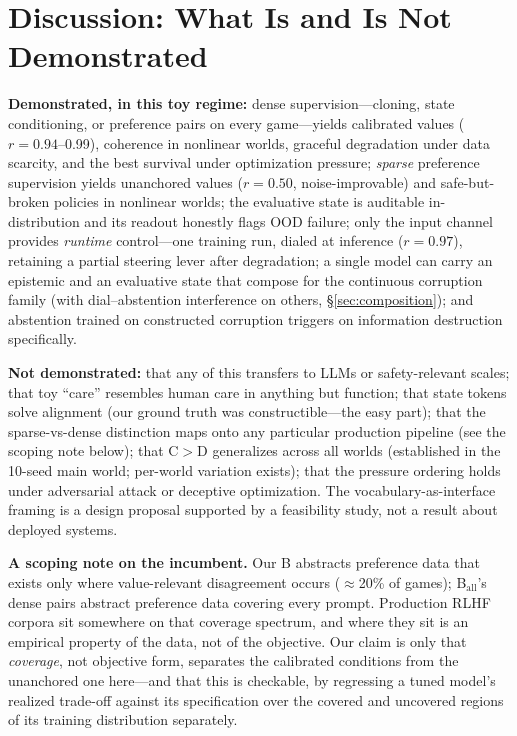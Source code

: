 \documentclass[11pt]{article}
\begin{document}
\section{Discussion: What Is and Is Not Demonstrated}
\label{sec:discussion}

\textbf{Demonstrated, in this toy regime:} dense supervision---cloning, state conditioning, or preference pairs on every game---yields calibrated values ($r{=}0.94$--0.99), coherence in nonlinear worlds, graceful degradation under data scarcity, and the best survival under optimization pressure; \emph{sparse} preference supervision yields unanchored values ($r{=}0.50$, noise-improvable) and safe-but-broken policies in nonlinear worlds; the evaluative state is auditable in-distribution and its readout honestly flags OOD failure; only the input channel provides \emph{runtime} control---one training run, dialed at inference ($r{=}0.97$), retaining a partial steering lever after degradation; a single model can carry an epistemic and an evaluative state that compose for the continuous corruption family (with dial--abstention interference on others, \S\ref{sec:composition}); and abstention trained on constructed corruption triggers on information destruction specifically.

\textbf{Not demonstrated:} that any of this transfers to LLMs or safety-relevant scales; that toy ``care'' resembles human care in anything but function; that state tokens solve alignment (our ground truth was constructible---the easy part); that the sparse-vs-dense distinction maps onto any particular production pipeline (see the scoping note below); that C$>$D generalizes across all worlds (established in the 10-seed main world; per-world variation exists); that the pressure ordering holds under adversarial attack or deceptive optimization. The vocabulary-as-interface framing is a design proposal supported by a feasibility study, not a result about deployed systems.

\textbf{A scoping note on the incumbent.} Our B abstracts preference data that exists only where value-relevant disagreement occurs ($\approx$20\% of games); B$_{\mathrm{all}}$'s dense pairs abstract preference data covering every prompt. Production RLHF corpora sit somewhere on that coverage spectrum, and where they sit is an empirical property of the data, not of the objective. Our claim is only that \emph{coverage}, not objective form, separates the calibrated conditions from the unanchored one here---and that this is checkable, by regressing a tuned model's realized trade-off against its specification over the covered and uncovered regions of its training distribution separately.
\end{document}
